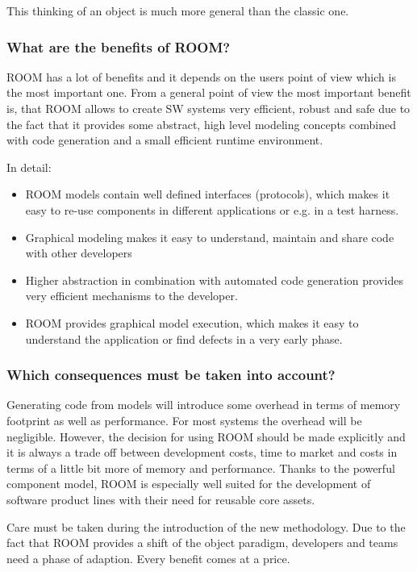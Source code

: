 This thinking of an object is much more general than the classic one.  

\subsubsection*{What are the benefits of ROOM?}

ROOM has a lot of benefits and it depends on the users point of view which is the most important one. From a general
point of view the most important benefit is, that ROOM allows to create SW systems very efficient, robust and safe
due to the fact that it provides some abstract, high level modeling concepts combined with code generation and a
small efficient runtime environment.  

In detail:
\begin{itemize}
\item ROOM models contain well defined interfaces (protocols), which makes it easy to re-use components in different
applications or e.g. in a test harness. 
\item Graphical modeling makes it easy to understand, maintain and share code with other developers
\item Higher abstraction in combination with automated code generation provides very efficient mechanisms to
the developer. 
\item ROOM provides graphical model execution, which makes it easy to understand the application or find defects in
a very early phase. 
\end{itemize}

\subsubsection*{Which consequences must be taken into account?}

Generating code from models will introduce some overhead in terms of memory footprint as well as performance.
For most systems the overhead will be negligible. However, the decision for using ROOM should be made explicitly
and it is always a trade off between development costs, time to market and costs in terms of a little bit more of
memory and performance. Thanks to the powerful component model, ROOM is especially well suited for the development
of software product lines with their need for reusable core assets.  
  
Care must be taken during the introduction of the new methodology. Due to the fact that ROOM provides a shift of the
object paradigm, developers and teams need a phase of adaption. Every benefit comes at a price.

